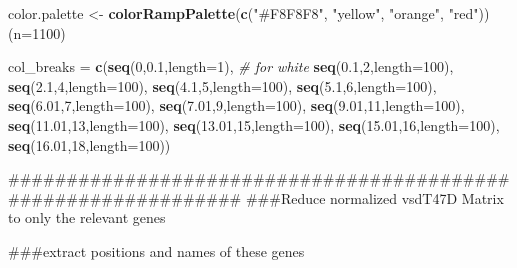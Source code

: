 \documentclass[]{article}
\newenvironment{Shaded}{\begin{snugshade}}{\end{snugshade}}
\newcommand{\KeywordTok}[1]{\textcolor[rgb]{0.13,0.29,0.53}{\textbf{#1}}}
\newcommand{\DataTypeTok}[1]{\textcolor[rgb]{0.13,0.29,0.53}{#1}}
\newcommand{\DecValTok}[1]{\textcolor[rgb]{0.00,0.00,0.81}{#1}}
\newcommand{\FloatTok}[1]{\textcolor[rgb]{0.00,0.00,0.81}{#1}}
\newcommand{\StringTok}[1]{\textcolor[rgb]{0.31,0.60,0.02}{#1}}
\newcommand{\CommentTok}[1]{\textcolor[rgb]{0.56,0.35,0.01}{\textit{#1}}}
\newcommand{\NormalTok}[1]{#1}
\begin{document}
\begin{Shaded}
\begin{Highlighting}[]
\NormalTok{color.palette <-}\StringTok{ }\KeywordTok{colorRampPalette}\NormalTok{(}\KeywordTok{c}\NormalTok{(}\StringTok{"#F8F8F8"}\NormalTok{, }\StringTok{"yellow"}\NormalTok{, }\StringTok{"orange"}\NormalTok{, }\StringTok{"red"}\NormalTok{))(}\DataTypeTok{n=}\DecValTok{1100}\NormalTok{)}

\NormalTok{col_breaks =}\StringTok{ }\KeywordTok{c}\NormalTok{(}\KeywordTok{seq}\NormalTok{(}\DecValTok{0}\NormalTok{,}\FloatTok{0.1}\NormalTok{,}\DataTypeTok{length=}\DecValTok{1}\NormalTok{),  }\CommentTok{# for white}
                \KeywordTok{seq}\NormalTok{(}\FloatTok{0.1}\NormalTok{,}\DecValTok{2}\NormalTok{,}\DataTypeTok{length=}\DecValTok{100}\NormalTok{),}
                \KeywordTok{seq}\NormalTok{(}\FloatTok{2.1}\NormalTok{,}\DecValTok{4}\NormalTok{,}\DataTypeTok{length=}\DecValTok{100}\NormalTok{),}
                \KeywordTok{seq}\NormalTok{(}\FloatTok{4.1}\NormalTok{,}\DecValTok{5}\NormalTok{,}\DataTypeTok{length=}\DecValTok{100}\NormalTok{),}
                \KeywordTok{seq}\NormalTok{(}\FloatTok{5.1}\NormalTok{,}\DecValTok{6}\NormalTok{,}\DataTypeTok{length=}\DecValTok{100}\NormalTok{),}
                \KeywordTok{seq}\NormalTok{(}\FloatTok{6.01}\NormalTok{,}\DecValTok{7}\NormalTok{,}\DataTypeTok{length=}\DecValTok{100}\NormalTok{),}
                \KeywordTok{seq}\NormalTok{(}\FloatTok{7.01}\NormalTok{,}\DecValTok{9}\NormalTok{,}\DataTypeTok{length=}\DecValTok{100}\NormalTok{),}
                \KeywordTok{seq}\NormalTok{(}\FloatTok{9.01}\NormalTok{,}\DecValTok{11}\NormalTok{,}\DataTypeTok{length=}\DecValTok{100}\NormalTok{),}
                \KeywordTok{seq}\NormalTok{(}\FloatTok{11.01}\NormalTok{,}\DecValTok{13}\NormalTok{,}\DataTypeTok{length=}\DecValTok{100}\NormalTok{),}
                \KeywordTok{seq}\NormalTok{(}\FloatTok{13.01}\NormalTok{,}\DecValTok{15}\NormalTok{,}\DataTypeTok{length=}\DecValTok{100}\NormalTok{),}
                \KeywordTok{seq}\NormalTok{(}\FloatTok{15.01}\NormalTok{,}\DecValTok{16}\NormalTok{,}\DataTypeTok{length=}\DecValTok{100}\NormalTok{),}
                \KeywordTok{seq}\NormalTok{(}\FloatTok{16.01}\NormalTok{,}\DecValTok{18}\NormalTok{,}\DataTypeTok{length=}\DecValTok{100}\NormalTok{))}

\NormalTok{###############################################################}
\NormalTok{###Reduce normalized vsdT47D Matrix to only the relevant genes}

\NormalTok{###extract positions and names of these genes}


\end{Highlighting}
\end{Shaded}
\end{document}
